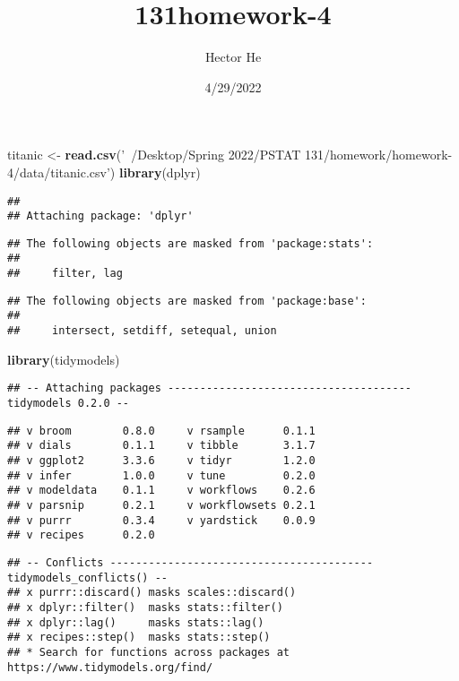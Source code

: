 \documentclass[]{article}
\title{131homework-4}
\author{Hector He}
\date{4/29/2022}
\newenvironment{Shaded}{\begin{snugshade}}{\end{snugshade}}
\newcommand{\KeywordTok}[1]{\textcolor[rgb]{0.13,0.29,0.53}{\textbf{#1}}}
\newcommand{\NormalTok}[1]{#1}
\newcommand{\StringTok}[1]{\textcolor[rgb]{0.31,0.60,0.02}{#1}}
\begin{document}
\maketitle

\begin{Shaded}
\begin{Highlighting}[]
\NormalTok{titanic <-}\StringTok{ }\KeywordTok{read.csv}\NormalTok{(}\StringTok{'~/Desktop/Spring 2022/PSTAT 131/homework/homework-4/data/titanic.csv'}\NormalTok{)}
\KeywordTok{library}\NormalTok{(dplyr)}
\end{Highlighting}
\end{Shaded}

\begin{verbatim}
## 
## Attaching package: 'dplyr'
\end{verbatim}

\begin{verbatim}
## The following objects are masked from 'package:stats':
## 
##     filter, lag
\end{verbatim}

\begin{verbatim}
## The following objects are masked from 'package:base':
## 
##     intersect, setdiff, setequal, union
\end{verbatim}

\begin{Shaded}
\begin{Highlighting}[]
\KeywordTok{library}\NormalTok{(tidymodels)}
\end{Highlighting}
\end{Shaded}

\begin{verbatim}
## -- Attaching packages -------------------------------------- tidymodels 0.2.0 --
\end{verbatim}

\begin{verbatim}
## v broom        0.8.0     v rsample      0.1.1
## v dials        0.1.1     v tibble       3.1.7
## v ggplot2      3.3.6     v tidyr        1.2.0
## v infer        1.0.0     v tune         0.2.0
## v modeldata    0.1.1     v workflows    0.2.6
## v parsnip      0.2.1     v workflowsets 0.2.1
## v purrr        0.3.4     v yardstick    0.0.9
## v recipes      0.2.0
\end{verbatim}

\begin{verbatim}
## -- Conflicts ----------------------------------------- tidymodels_conflicts() --
## x purrr::discard() masks scales::discard()
## x dplyr::filter()  masks stats::filter()
## x dplyr::lag()     masks stats::lag()
## x recipes::step()  masks stats::step()
## * Search for functions across packages at https://www.tidymodels.org/find/
\end{verbatim}
\end{document}
